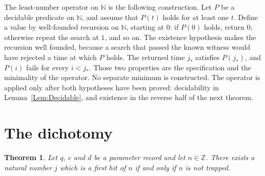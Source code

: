 \documentclass[11pt,letterpaper]{article}
\newcommand{\N}{\mathbb{N}}
\newcommand{\Z}{\mathbb{Z}}
\newtheorem{theorem}{Theorem}
\begin{document}
The least-number operator on \(\N\) is the following construction. Let \(P\) be a decidable predicate on \(\N\), and assume that \(P(t)\) holds for at least one \(t\). Define a value by well-founded recursion on \(\N\), starting at \(0\): if \(P(0)\) holds, return \(0\); otherwise repeat the search at \(1\), and so on. The existence hypothesis makes the recursion well founded, because a search that passed the known witness would have rejected a time at which \(P\) holds. The returned time \(j_{\ast}\) satisfies \(P(j_{\ast})\), and \(P(i)\) fails for every \(i<j_{\ast}\). Those two properties are the specification and the minimality of the operator. No separate minimum is constructed. The operator is applied only after both hypotheses have been proved: decidability in Lemma~\ref{Lem:Decidable}, and existence in the reverse half of the next theorem.

\section{The dichotomy}

\begin{theorem}\label{Thm:Dichotomy}
Let \(q\), \(c\) and \(d\) be a parameter record and let \(n\in\Z\). There exists a natural number \(j\) which is a first hit of \(n\) if and only if \(n\) is not trapped.
\end{theorem}
\end{document}
